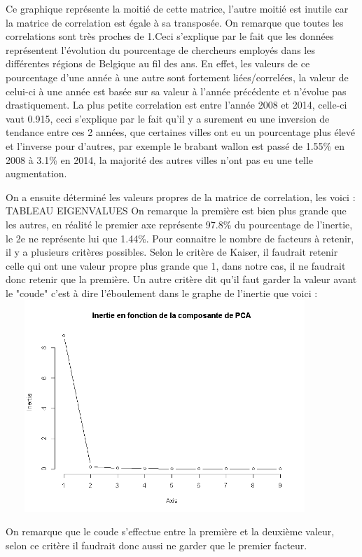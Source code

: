 \documentclass{article}
\begin{document}
 Ce graphique représente la moitié de cette matrice, l'autre moitié est inutile car la matrice de correlation est égale à sa transposée. On remarque que toutes les correlations sont très proches de 1.Ceci s'explique par le fait que les données représentent l'évolution du pourcentage de chercheurs employés dans les différentes régions de Belgique au fil des ans. En effet, les valeurs de ce pourcentage d'une année à une autre sont fortement liées/correlées, la valeur de celui-ci à une année est basée sur sa valeur à l'année précédente et n'évolue pas drastiquement. La plus petite correlation est entre l'année 2008 et 2014, celle-ci vaut 0.915, ceci s'explique par le fait qu'il y a surement eu une inversion de tendance entre ces 2 années, que certaines villes ont eu un pourcentage plus élevé et l'inverse pour d'autres, par exemple le brabant wallon est passé de 1.55\% en 2008 à 3.1\% en 2014, la majorité des autres villes n'ont pas eu une telle augmentation. 
 
 On a ensuite déterminé les valeurs propres de la matrice de correlation, les voici :
 TABLEAU EIGENVALUES
 On remarque la première est bien plus grande que les autres, en réalité le premier axe représente 97.8\% du pourcentage de l'inertie, le 2e ne représente lui que 1.44\%.
 Pour connaitre le nombre de facteurs à retenir, il y a plusieurs critères possibles.  
 Selon le critère de Kaiser, il faudrait retenir celle qui ont une valeur propre plus grande que 1, dans notre cas, il ne faudrait donc retenir que la première.
 Un autre critère dit qu'il faut garder la valeur avant le "coude" c'est à dire l'éboulement dans le graphe de l'inertie que voici : 
 \newpage
  \includegraphics[width=12cm,height=8cm]{"screeplot"}
 
 
	On remarque que le coude s'effectue entre la première et la deuxième valeur, selon ce critère il faudrait donc aussi ne garder que le premier facteur.
  
\end{document}
